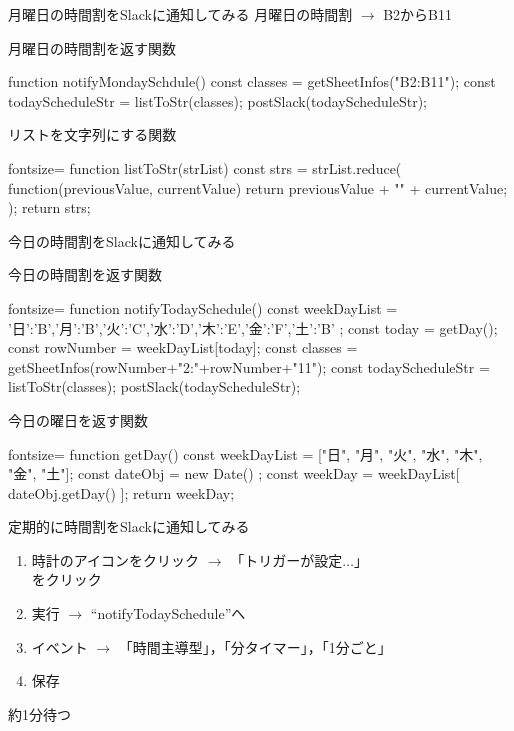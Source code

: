 \documentclass[dvipdfmx,xcolor={svgnames}]{beamer}
\begin{document}
  \begin{frame}[fragile]{月曜日の時間割をSlackに通知してみる}
    月曜日の時間割 $\rightarrow$ B2からB11
    \begin{exampleblock}{月曜日の時間割を返す関数}
      \begin{GAS}
function notifyMondaySchdule(){
  const classes = getSheetInfos("B2:B11");
  const todayScheduleStr = listToStr(classes);
  postSlack(todayScheduleStr);
}
      \end{GAS}
    \end{exampleblock}
    \begin{exampleblock}{リストを文字列にする関数}
      \begin{GAS*}{fontsize=\small}
function listToStr(strList){
  const strs = strList.reduce(
    function(previousValue, currentValue){
    return previousValue + "\n" + currentValue;
  });
  return strs;
}
      \end{GAS*}
    \end{exampleblock}
  \end{frame}
  \begin{frame}[fragile]{今日の時間割をSlackに通知してみる}
    \begin{exampleblock}{今日の時間割を返す関数}
      \begin{GAS*}{fontsize=\scriptsize}
function notifyTodaySchedule(){
  const weekDayList = {
    '日':'B','月':'B','火':'C','水':'D','木':'E','金':'F','土':'B'
  };
  const today = getDay();
  const rowNumber = weekDayList[today];
  const classes = getSheetInfos(rowNumber+"2:"+rowNumber+"11");
  const todayScheduleStr = listToStr(classes);
  postSlack(todayScheduleStr);
}
      \end{GAS*}
    \end{exampleblock}
    \begin{exampleblock}{今日の曜日を返す関数}
      \begin{GAS*}{fontsize=\small}
function getDay(){
  const weekDayList = ["日", "月", "火", "水", "木", "金", "土"];
  const dateObj = new Date() ;
  const weekDay = weekDayList[ dateObj.getDay() ];
  return weekDay;
}
      \end{GAS*}
    \end{exampleblock}
  \end{frame}
  \begin{frame}{定期的に時間割をSlackに通知してみる}
    \begin{enumerate}\setlength{\itemsep}{15pt}
      \item 時計のアイコンをクリック $\rightarrow$ 「トリガーが設定$\ldots$」\\ をクリック
      \item 実行 $\rightarrow$ ``notifyTodaySchedule''へ
      \item イベント $\rightarrow$ 「時間主導型」，「分タイマー」，「1分ごと」
      \item 保存
    \end{enumerate}
    \LARGE 約1分待つ
  \end{frame}
\end{document}
